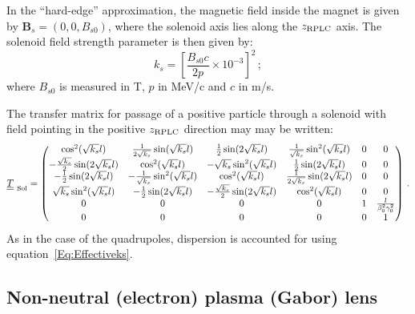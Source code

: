 In the ``hard-edge'' approximation, the magnetic field inside the
magnet is given by $\bm{B}_s = (0, 0, B_{s0})$, where the solenoid axis
lies along the $z_{\rm RPLC}$ axis.
The solenoid field strength parameter is then given by:
\begin{equation}
  k_s = \left[ \frac{B_{s0} c}{2p} \times 10^{-3} \right]^2\,; \label{Eq:Effectiveks}
\end{equation}
where $B_{s0}$ is measured in T, $p$ in MeV/c and $c$ in m/s.

The transfer matrix for passage of a positive particle through a
solenoid with field pointing in the positive $z_{\rm RPLC}$ direction
may may be written: 
\begin{equation}
  \underline{\underline{T}}_{\rm~Sol} =
    \begin{pmatrix}
                             \cos^2(\sqrt{k_s} l) &   \frac{1}{2\sqrt{k_s}} \sin(\sqrt{k_s} l) &         \frac{1}{2} \sin(2\sqrt{k_s} l) & \frac{1}{\sqrt{k_s}} \sin^2(\sqrt{k_s} l) & 0 & 0 \\
          -\frac{\sqrt{k_s}}{2} \sin(2\sqrt{k_s} l) &                     \cos^2(\sqrt{k_s} l) &           -\sqrt{k_s}\sin^2(\sqrt{k_s} l) &         \frac{1}{2} \sin(2\sqrt{k_s} l) & 0 & 0 \\
                 -\frac{1}{2} \sin(2\sqrt{k_s} l) & -\frac{1}{\sqrt{k_s}} \sin^2(\sqrt{k_s} l) &                    \cos^2(\sqrt{k_s} l) & \frac{1}{2\sqrt{k_s}} \sin(2\sqrt{k_s} l) & 0 & 0 \\
                    \sqrt{k_s} \sin^2(\sqrt{k_s} l) &         -\frac{1}{2} \sin(2\sqrt{k_s} l) & -\frac{\sqrt{k_s}}{2} \sin(2\sqrt{k_s} l) &                    \cos^2(\sqrt{k_s} l) & 0 & 0 \\
          0 & 0 & 0 & 0 & 1 & \frac{l}{\beta_0^2 \gamma_0^2} \\
          0 & 0 & 0 & 0 & 0 &                             1
        \end{pmatrix} \, .
\end{equation}
As in the case of the quadrupoles, dispersion is accounted for using
equation~\ref{Eq:Effectiveks}.

\subsection{Non-neutral (electron) plasma (Gabor) lens}


